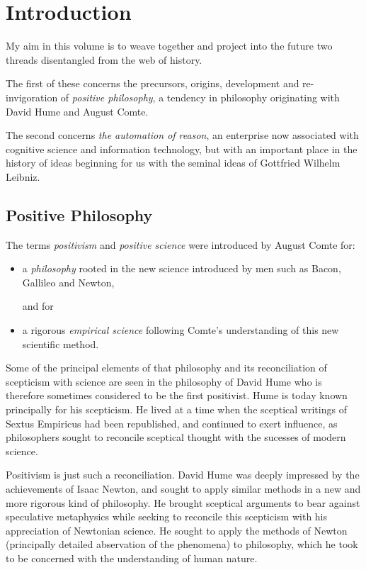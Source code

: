 

\chapter{Introduction}\label{Introduction}

My aim in this volume is to weave together and project into the future two threads disentangled from the web of history.

The first of these concerns the precursors, origins, development and re-invigoration of {\it positive philosophy},
a tendency in philosophy originating with David Hume and August Comte.

The second concerns {\it the automation of reason}, an enterprise now associated with cognitive science
and information technology, but with an important place in the history of ideas beginning for us
with the seminal ideas of Gottfried Wilhelm Leibniz.

\section{Positive Philosophy}

The terms {\it positivism} and {\it positive science} were introduced by August Comte for:
\begin{itemize}
\item a {\it philosophy} rooted in the new science introduced by men such as Bacon, Gallileo and Newton,

and for
\item a rigorous {\it empirical science} following Comte's understanding of this new scientific method.
\end{itemize}

Some of the principal elements of that philosophy and its reconciliation of scepticism with science
are seen in the philosophy of David Hume who is therefore sometimes considered to be the first positivist.
Hume is today known principally for his scepticism.
He lived at a time when the sceptical writings of Sextus Empiricus had been republished,
and continued to exert influence, as philosophers sought to reconcile sceptical thought
with the sucesses of modern science.

Positivism is just such a reconciliation.
David Hume was deeply impressed by the achievements of Isaac Newton, and sought to apply similar methods in a new and more rigorous kind of philosophy.
He brought sceptical arguments to bear against speculative metaphysics while seeking to reconcile this scepticism with his appreciation of Newtonian science.
He sought to apply the methods of Newton (principally detailed abservation of the phenomena) to philosophy, which he took to be concerned with the understanding of human nature.

